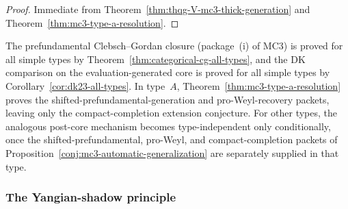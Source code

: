 \begin{proof}
Immediate from Theorem~\ref{thm:thqg-V-mc3-thick-generation} and
Theorem~\ref{thm:mc3-type-a-resolution}.
\end{proof}

\begin{remark}
\label{rem:thqg-V-mc3-arbitrary-type}
The prefundamental Clebsch--Gordan closure
\textup{(}package~\textup{(i)} of MC3\textup{)} is proved for all simple
types by Theorem~\ref{thm:categorical-cg-all-types}, and the DK
comparison on the evaluation-generated core is proved for all simple
types by Corollary~\ref{cor:dk23-all-types}. In type~$A$,
Theorem~\ref{thm:mc3-type-a-resolution} proves the
shifted-prefundamental-generation and pro-Weyl-recovery packets,
leaving only the compact-completion extension conjecture. For other
types, the analogous post-core mechanism becomes type-independent only
conditionally, once the shifted-prefundamental, pro-Weyl, and
compact-completion packets of
Proposition~\ref{conj:mc3-automatic-generalization} are separately
supplied in that type.
\end{remark}


\subsubsection{The Yangian-shadow principle}

